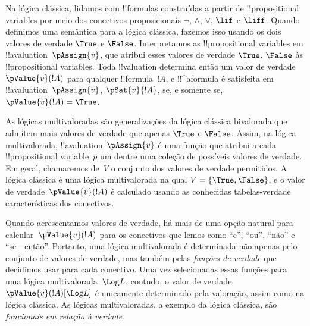 \documentclass[../../../include/open-logic-section]{subfiles}
\begin{document}


Na lógica clássica, lidamos com !!{formula}s construídas a partir de
!!{propositional variable}s por meio dos conectivos proposicionais
$\lnot$, $\land$, $\lor$, $\lif$ e $\liff$. Quando definimos uma
semântica para a lógica clássica, fazemos isso usando os dois valores de verdade
$\True$ e $\False$. Interpretamos as !!{propositional variable}s em
!!a{valuation}~$\pAssign{v}$, que atribui esses valores de verdade
$\True$, $\False$ às !!{propositional variable}s. Toda
!!{valuation} determina então um valor de verdade $\pValue{v}(!A)$ para qualquer
!!{formula}~$!A$, e !!^a{formula} é satisfeita em
!!a{valuation}~$\pAssign{v}$, $\pSat{v}{!A}$, se, e somente se, $\pValue{v}(!A) =
\True$.

As lógicas multivaloradas são generalizações da lógica clássica bivalorada
que admitem mais valores de verdade que apenas $\True$ e $\False$. Assim, na
lógica multivalorada, !!a{valuation}~$\pAssign{v}$ é uma função que
atribui a cada !!{propositional variable}~$p$ um dentre uma coleção de
possíveis valores de verdade. Em geral, chamaremos de~$V$ o conjunto dos valores de verdade
permitidos. A lógica clássica é uma lógica multivalorada na qual $V =
\{\True, \False\}$, e o valor de verdade~$\pValue{v}(!A)$ é calculado
usando as conhecidas tabelas-verdade características dos conectivos.

Quando acrescentamos valores de verdade, há mais de uma opção natural
para calcular~$\pValue{v}(!A)$ para os conectivos que lemos
como ``e'', ``ou'', ``não'' e ``se---então''. Portanto, uma lógica multivalorada
é determinada não apenas pelo conjunto de valores de verdade, mas também pelas
\emph{funções de verdade} que decidimos usar para cada conectivo. Uma vez
selecionadas essas funções para uma lógica multivalorada~$\Log L$, contudo, o
valor de verdade $\pValue{v}(!A)[\Log L]$ é unicamente determinado pela
valoração, assim como na lógica clássica. As lógicas multivaloradas, a exemplo da
lógica clássica, são \emph{funcionais em relação à verdade}.
\end{document}
